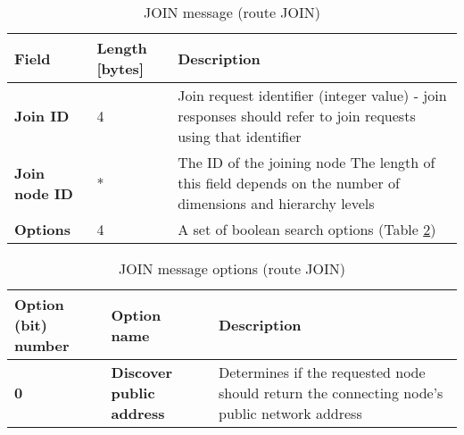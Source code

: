 \begin{table}[H]
\scriptsize
\begin{center}
\begin{tabular}{p{3cm} p{2cm} p{9.5cm}}
	\hline
	\textbf{Field}						& \textbf{Length} [bytes]				& \textbf{Description}				\\[1mm]
    \hline
    \textbf{Join ID}					& 4										& Join request identifier (integer value) - join responses should refer to join requests using that identifier					\\[1.5mm]
	\textbf{Join node ID}				& *										& The ID of the joining node \newline * The length of this field depends on the number of dimensions and hierarchy levels					\\[1.5mm]	
	\textbf{Options}					& 4										& A set of boolean search options (Table \ref{tab:mRouteJoinOptions})				\\[1.5mm]
    \hline
\end{tabular}
\end{center}
\caption{JOIN message (route JOIN)}
\label{tab:mRouteJoin}
\end{table}

\begin{table}[H]
\scriptsize
\begin{center}
\begin{tabular}{p{3cm} p{3cm} p{8.5cm}}
	\hline
	\textbf{Option (bit) number}			& \textbf{Option name}					& \textbf{Description}				\\[1mm]
    \hline
	\textbf{0}								& \textbf{Discover public address}		& Determines if the requested node should return the connecting node's public network address						\\[1.5mm]
    \hline
\end{tabular}
\end{center}
\caption{JOIN message options (route JOIN)}
\label{tab:mRouteJoinOptions}
\end{table}





